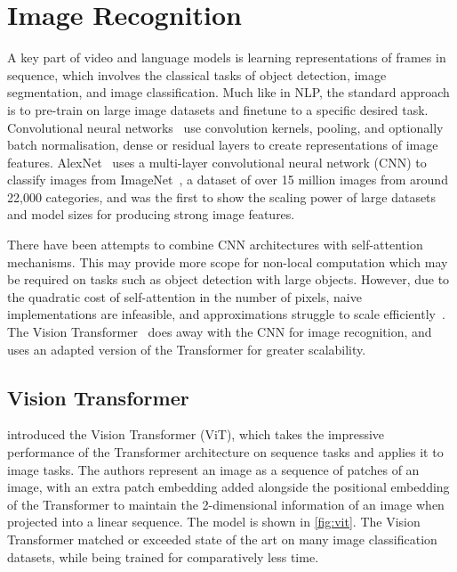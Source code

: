 \section{Image Recognition}
\label{sec:imrec}

A key part of video and language models is learning representations of frames
in sequence, which involves the classical tasks of object detection, image
segmentation, and image classification. Much like in NLP, the standard approach
is to pre-train on large image datasets and finetune to a specific desired
task. Convolutional neural
networks~\citep{lecun1989lenet,krizhevsky2012alexnet,he2016resnet} use
convolution kernels, pooling, and optionally batch normalisation, dense or
residual layers to create representations of image features.
AlexNet~\citep{krizhevsky2012alexnet} uses a multi-layer convolutional neural
network (CNN) to classify images from ImageNet~\citep{deng2009imagenet}, a
dataset of over 15 million images from around 22,000 categories, and was the
first to show the scaling power of large datasets and model sizes for producing
strong image features. 

There have been attempts to combine CNN architectures with self-attention
mechanisms. This may provide more scope for non-local computation which may be
required on tasks such as object detection with large objects. However, due to
the quadratic cost of self-attention in the number of pixels, naive
implementations are infeasible, and approximations struggle to scale
efficiently~\citep{carion2020detr}. The Vision
Transformer~\citep{dosovitskiy2021vit} does away with the CNN for image
recognition, and uses an adapted version of the Transformer for greater
scalability.


\subsection{Vision Transformer}
\label{ssec:vit}

\citet{dosovitskiy2021vit} introduced the Vision Transformer (ViT), which takes
the impressive performance of the Transformer architecture on sequence tasks
and applies it to image tasks. The authors represent an image as a sequence of
patches of an image, with an extra patch embedding added alongside the
positional embedding of the Transformer \citep{vaswani2017attention} to maintain
the 2-dimensional information of an image when projected into a linear
sequence. The model is shown in \cref{fig:vit}. The Vision Transformer matched
or exceeded state of the art on many image classification datasets, while being
trained for comparatively less time.

